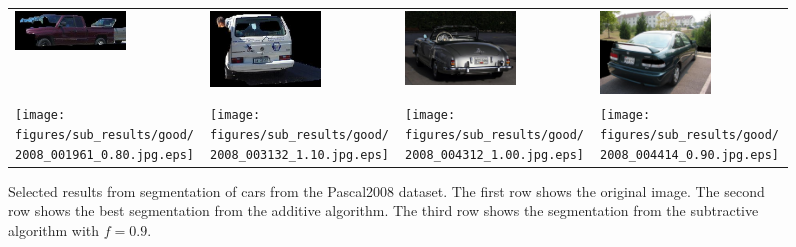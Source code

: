 \documentclass[10pt,twocolumn,letterpaper]{article}
\begin{document}
\begin{figure}[p]
\begin{tabular}{ p{3cm} p{3cm} p{3cm} p{3cm} }
\includegraphics[width=2.95cm]{figures/add_res/car/bad/2008_001961.jpg_1_bad.jpg.eps} &
\includegraphics[width=2.95cm]{figures/add_res/car/bad/2008_003132.jpg_1_bad.jpg.eps} &
\includegraphics[width=2.95cm]{figures/add_res/car/bad/2008_004312.jpg_1_bad.jpg.eps} &
\includegraphics[width=2.95cm]{figures/add_res/car/bad/2008_004414.jpg_1_bad.jpg.eps} \\

\texttt{[image: figures/sub\_results/good/2008\_001961\_0.80.jpg.eps]} &
\texttt{[image: figures/sub\_results/good/2008\_003132\_1.10.jpg.eps]} &
\texttt{[image: figures/sub\_results/good/2008\_004312\_1.00.jpg.eps]} &
\texttt{[image: figures/sub\_results/good/2008\_004414\_0.90.jpg.eps]} \\

\end{tabular}
\caption{Selected results from segmentation of cars from the Pascal2008
dataset.  The first row shows the original image.  The second row shows
the best segmentation from the additive algorithm.  The third row shows
the segmentation from the subtractive algorithm with $f=0.9$.}
\label{fig:car_bad_results}
\end{figure}
\end{document}
